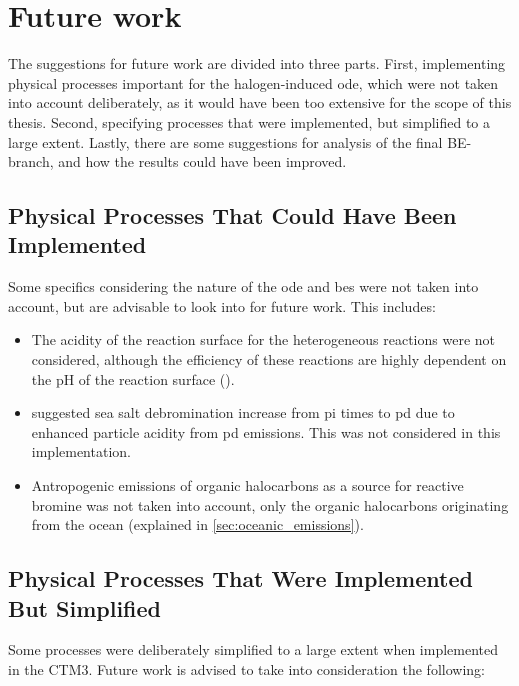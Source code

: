 \section{Future work}

The suggestions for future work are divided into three parts. First, implementing physical processes important for the halogen-induced \acrfull{ode}, which were not taken into account deliberately, as it would have been too extensive for the scope of this thesis. Second, specifying processes that were implemented, but simplified to a large extent. Lastly, there are some suggestions for analysis of the final BE-branch, and how the results could have been improved.

\subsection{Physical Processes That Could Have Been Implemented}

Some specifics considering the nature of the \acrshort{ode} and \acrfull{be}s were not taken into account, but are advisable to look into for future work. This includes: 
\begin{itemize}
    \item The acidity of the reaction surface for the heterogeneous reactions were not considered, although the efficiency of these reactions are highly dependent on the pH of the reaction surface (\cite{KerriAPratt2013}).
    \item \cite{Parella} suggested sea salt debromination increase from \acrlong{pi} times to \acrlong{pd} due to enhanced particle acidity from \acrlong{pd} emissions. This was not considered in this implementation.
    \item Antropogenic emissions of organic halocarbons as a source for reactive bromine was not taken into account, only the organic halocarbons originating from the ocean (explained in \ref{sec:oceanic_emissions}).  
\end{itemize}

\subsection{Physical Processes That Were Implemented But Simplified}

Some processes were deliberately simplified to a large extent when implemented in the CTM3. Future work is advised to take into consideration the following: 


